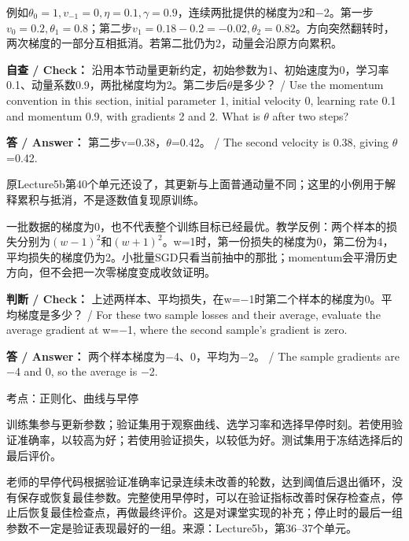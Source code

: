 例如\(\theta_0=1,v_{-1}=0,\eta=0.1,\gamma=0.9\)，连续两批提供的梯度为2和\ensuremath{-}2。第一步\(v_0=0.2,\theta_1=0.8\)；第二步\(v_1=0.18-0.2=-0.02,\theta_2=0.82\)。方向突然翻转时，两次梯度的一部分互相抵消。若第二批仍为2，动量会沿原方向累积。


\textbf{自查 / Check：} 沿用本节动量更新约定，初始参数为1、初始速度为0，学习率0.1、动量系数0.9，两批梯度均为2。第二步后\ensuremath{\theta}是多少？ / Use the momentum convention in this section, initial parameter 1, initial velocity 0, learning rate 0.1 and momentum 0.9, with gradients 2 and 2. What is \ensuremath{\theta} after two steps?


\textbf{答 / Answer：} 第二步v=0.38，\ensuremath{\theta}=0.42。 / The second velocity is 0.38, giving \ensuremath{\theta}=0.42.


原Lecture5b第40个单元还设了，其更新与上面普通动量不同；这里的小例用于解释累积与抵消，不是逐数值复现原训练。


一批数据的梯度为0，也不代表整个训练目标已经最优。教学反例：两个样本的损失分别为\((w-1)^2\)和\((w+1)^2\)。w=1时，第一份损失的梯度为0，第二份为4，平均损失的梯度仍为2。小批量SGD只看当前抽中的那批；momentum会平滑历史方向，但不会把一次零梯度变成收敛证明。


\textbf{判断 / Check：} 上述两样本、平均损失，在w=\ensuremath{-}1时第二个样本的梯度为0。平均梯度是多少？ / For these two sample losses and their average, evaluate the average gradient at w=\ensuremath{-}1, where the second sample's gradient is zero.


\textbf{答 / Answer：} 两个样本梯度为\ensuremath{-}4、0，平均为\ensuremath{-}2。 / The sample gradients are \ensuremath{-}4 and 0, so the average is \ensuremath{-}2.








考点：正则化、曲线与早停
  

训练集参与更新参数；验证集用于观察曲线、选学习率和选择早停时刻。若使用验证准确率，以较高为好；若使用验证损失，以较低为好。测试集用于冻结选择后的最后评价。


老师的早停代码根据验证准确率记录连续未改善的轮数，达到阈值后退出循环，没有保存或恢复最佳参数。完整使用早停时，可以在验证指标改善时保存检查点，停止后恢复最佳检查点，再做最终评价。这是对课堂实现的补充；停止时的最后一组参数不一定是验证表现最好的一组。来源：Lecture5b，第36–37个单元。


